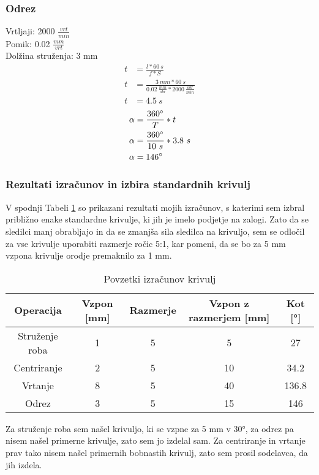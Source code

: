 \subsubsection{Odrez}
\label{izracun_odreza}
Vrtljaji: 2000 \( \frac{vrt}{min} \) \\
Pomik: 0.02 \( \frac{mm}{vrt} \) \\
Dolžina struženja: 3 mm
\begin{equation}
	\begin{split}
		t &= \frac{l*60\ s}{f*S} \\
		t &= \frac{3\ mm*60\ s}{0.02\ \frac{mm}{obr}*2000\ \frac{obr}{min}} \\
		t &= 4.5\ s
	\end{split}
\end{equation}
\begin{equation}
	\begin{split}
		\alpha &= \frac{360\degree}{T} * t \\
		\alpha &= \frac{360\degree}{10\ s} * 3.8\ s\\
		\alpha &= 146\degree
	\end{split}
\end{equation}

\subsubsection{Rezultati izračunov in izbira standardnih krivulj}
V spodnji Tabeli \ref{Tabela rezultatov} so prikazani
rezultati mojih izračunov, s katerimi sem izbral približno
enake standardne krivulje, ki jih je imelo podjetje na zalogi.
Zato da se sledilci manj obrabljajo in da se zmanjša sila sledilca
na krivuljo, sem se odločil za vse krivulje uporabiti razmerje ročic
5:1, kar pomeni, da se bo za 5 mm vzpona krivulje orodje premaknilo za 1 mm.

\begin{table}[H]
	\caption{Povzetki izračunov krivulj}
	\label{Tabela rezultatov}
	\begin{center}
		\begin{tabular}{|c|c|c|c|c|}
			\hline
			Operacija      & Vzpon [mm] & Razmerje & Vzpon z razmerjem [mm] & Kot [°] \\
			\hline
			Struženje roba & 1          & 5        & 5                      & 27      \\
			\hline
			Centriranje    & 2          & 5        & 10                     & 34.2    \\
			\hline
			Vrtanje        & 8          & 5        & 40                     & 136.8   \\
			\hline
			Odrez          & 3          & 5        & 15                     & 146     \\
			\hline
		\end{tabular}
	\end{center}
\end{table}

Za struženje roba sem našel krivuljo, ki se vzpne za 5 mm v 30°,
za odrez pa nisem našel primerne krivulje, zato sem jo izdelal sam.
Za centriranje in vrtanje prav tako nisem našel primernih bobnastih krivulj,
zato sem prosil sodelavca, da jih izdela.